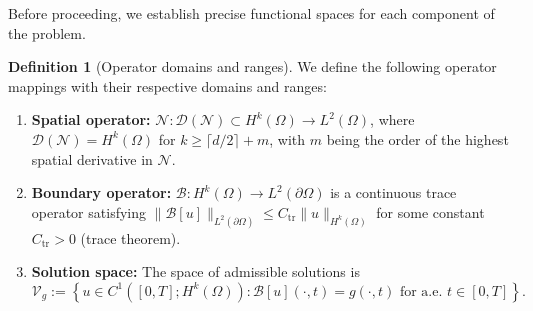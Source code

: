 \documentclass[11pt,reqno]{amsart}
\theoremstyle{plain}
\theoremstyle{definition}
\newtheorem{definition}[theorem]{Definition}
\theoremstyle{remark}
\begin{document}
\medskip
\noindent Before proceeding, we establish precise functional spaces for each component of the problem.

\begin{definition}[Operator domains and ranges]\label{def:operator_spaces}
We define the following operator mappings with their respective domains and ranges:
\begin{enumerate}[label=(\roman*)]
    \item \textbf{Spatial operator:} $\mathcal{N}: \mathcal{D}(\mathcal{N}) \subset H^k(\Omega) \to L^2(\Omega)$, 
    where $\mathcal{D}(\mathcal{N}) = H^k(\Omega)$ for $k \geq \lceil d/2 \rceil + m$, 
    with $m$ being the order of the highest spatial derivative in $\mathcal{N}$.
    
    \item \textbf{Boundary operator:} $\mathcal{B}: H^k(\Omega) \to L^2(\partial\Omega)$ 
    is a continuous trace operator satisfying $\|\mathcal{B}[u]\|_{L^2(\partial\Omega)} \leq C_{\text{tr}} \|u\|_{H^k(\Omega)}$ 
    for some constant $C_{\text{tr}} > 0$ (trace theorem).
    
    \item \textbf{Solution space:} The space of admissible solutions is
    \[
    \mathcal{V}_g := \left\{ u \in C^1([0,T]; H^k(\Omega)) : \mathcal{B}[u](\cdot,t) = g(\cdot,t) \text{ for a.e. } t \in [0,T] \right\}.
    \]
\end{enumerate}
\end{definition}
\end{document}
